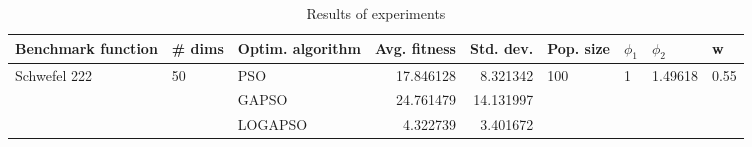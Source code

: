 \begin{table}
\centering
\caption{Results of experiments}
\begin{tabular}{lllrrllll}
\toprule
           Benchmark function &             \# dims & Optim. algorithm &  Avg. fitness &  Std. dev. &            Pop. size &         $\phi_{1}$ &               $\phi_{2}$ &                     w \\
\midrule
\multirow{3}{*}{Schwefel 222} & \multirow{3}{*}{50} &              PSO &     17.846128 &   8.321342 & \multirow{3}{*}{100} & \multirow{3}{*}{1} & \multirow{3}{*}{1.49618} & \multirow{3}{*}{0.55} \\
                              &                     &            GAPSO &     24.761479 &  14.131997 &                      &                    &                          &                       \\
                              &                     &          LOGAPSO &      4.322739 &   3.401672 &                      &                    &                          &                       \\
\bottomrule
\end{tabular}
\end{table}
